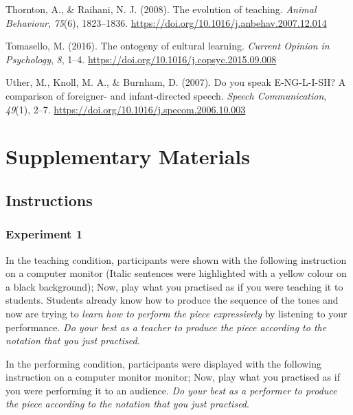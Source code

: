 \documentclass[
  english,
  man,floatsintext]{apa6}
\newlength{\cslhangindent}
\newenvironment{CSLReferences}[2] %
 {%
  \setlength{\parindent}{0pt}
  \ifodd #1 \everypar{\setlength{\hangindent}{\cslhangindent}}\ignorespaces\fi
  \ifnum #2 > 0
  \setlength{\parskip}{#2\baselineskip}
  \fi
 }%
 {}
\begin{document}
\begin{CSLReferences}{1}{0}
\leavevmode{}%
Thornton, A., \& Raihani, N. J. (2008). The evolution of teaching. \emph{Animal Behaviour}, \emph{75}(6), 1823--1836. \url{https://doi.org/10.1016/j.anbehav.2007.12.014}

\leavevmode{}%
Tomasello, M. (2016). The ontogeny of cultural learning. \emph{Current Opinion in Psychology}, \emph{8}, 1--4. \url{https://doi.org/10.1016/j.copsyc.2015.09.008}

\leavevmode{}%
Uther, M., Knoll, M. A., \& Burnham, D. (2007). Do you speak {E}-{NG}-{L}-{I}-{SH}? {A} comparison of foreigner- and infant-directed speech. \emph{Speech Communication}, \emph{49}(1), 2--7. \url{https://doi.org/10.1016/j.specom.2006.10.003}

\end{CSLReferences}

\endgroup

\clearpage

\hypertarget{supplementary}{%
\section{Supplementary Materials}\label{supplementary}}

\hypertarget{instructions}{%
\subsection{Instructions}\label{instructions}}

\hypertarget{experiment-1-1}{%
\subsubsection{Experiment 1}\label{experiment-1-1}}

In the teaching condition, participants were shown with the following instruction on a computer monitor (Italic sentences were highlighted with a yellow colour on a black background); Now, play what you practised as if you were teaching it to students. Students already know how to produce the sequence of the tones and now are trying to \emph{learn how to perform the piece expressively} by listening to your performance. \emph{Do your best as a teacher to produce the piece according to the notation that you just practised}.

In the performing condition, participants were displayed with the following instruction on a computer monitor monitor; Now, play what you practised as if you were performing it to an audience. \emph{Do your best as a performer to produce the piece according to the notation that you just practised}.
\end{document}
